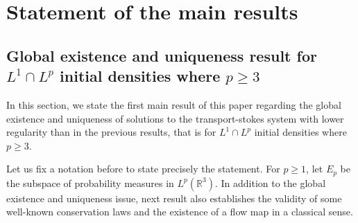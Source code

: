 \documentclass[10pt]{amsart}
\theoremstyle{definition}\newtheorem{defi}[theo]{Definition}\newtheorem{rema}[theo]{Remark}\newtheorem{exam}[theo]{Example}\newtheorem{exem}[theo]{Example}\newtheorem{nota}[theo]{Notation}
\newcommand{\R}{\mathbb{R}}
\renewcommand{\geq}{\geqslant}
\begin{document}
\section{Statement of the main results}

\subsection{Global existence and uniqueness result for \texorpdfstring{$L^1 \cap L^p$}{L1 n Lp} initial densities where \texorpdfstring{$p \geq 3$}{p>=3}}

In this section, we state the first main result of this paper regarding the global existence and uniqueness of solutions to the transport-stokes system with lower regularity than in the previous results, that is for $L^1 \cap L^p$ initial densities where $p \geq 3$.

Let us fix a notation before to state precisely the statement. For $p\geq 1$, let $E_p$ be the subspace of probability measures in $ L^p (\R^3) $. In addition to the global existence and uniqueness issue, next result also establishes the validity of some well-known conservation laws and the existence of a flow map in a classical sense.
\end{document}
